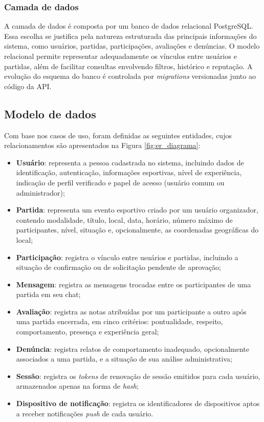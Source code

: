 \documentclass[a4paper, 12pt]{article}
\begin{document}
\begin{justify}
\subsubsection{Camada de dados}

A camada de dados é composta por um banco de dados relacional PostgreSQL. Essa escolha se justifica pela natureza estruturada das principais informações do sistema, como usuários, partidas, participações, avaliações e denúncias. O modelo relacional permite representar adequadamente os vínculos entre usuários e partidas, além de facilitar consultas envolvendo filtros, histórico e reputação. A evolução do esquema do banco é controlada por \textit{migrations} versionadas junto ao código da API.

\subsection{Modelo de dados}

Com base nos casos de uso, foram definidas as seguintes entidades, cujos relacionamentos são apresentados na Figura \ref{fig:er_diagrama}:

\begin{itemize}
    \item \textbf{Usuário}: representa a pessoa cadastrada no sistema, incluindo dados de identificação, autenticação, informações esportivas, nível de experiência, indicação de perfil verificado e papel de acesso (usuário comum ou administrador);
    \item \textbf{Partida}: representa um evento esportivo criado por um usuário organizador, contendo modalidade, título, local, data, horário, número máximo de participantes, nível, situação e, opcionalmente, as coordenadas geográficas do local;
    \item \textbf{Participação}: registra o vínculo entre usuários e partidas, incluindo a situação de confirmação ou de solicitação pendente de aprovação;
    \item \textbf{Mensagem}: registra as mensagens trocadas entre os participantes de uma partida em seu chat;
    \item \textbf{Avaliação}: registra as notas atribuídas por um participante a outro após uma partida encerrada, em cinco critérios: pontualidade, respeito, comportamento, presença e experiência geral;
    \item \textbf{Denúncia}: registra relatos de comportamento inadequado, opcionalmente associados a uma partida, e a situação de sua análise administrativa;
    \item \textbf{Sessão}: registra os \textit{tokens} de renovação de sessão emitidos para cada usuário, armazenados apenas na forma de \textit{hash};
    \item \textbf{Dispositivo de notificação}: registra os identificadores de dispositivos aptos a receber notificações \textit{push} de cada usuário.
\end{itemize}


\end{justify}
\end{document}

